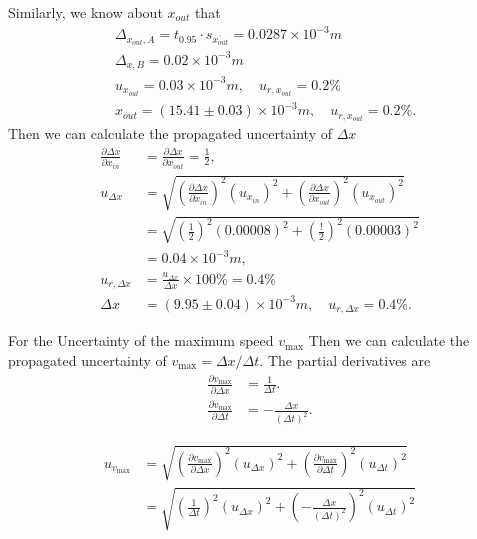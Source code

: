 Similarly, we know about $x_{out}$ that
\[
\begin{split}
    &\Delta_{x_{out},A}=t_{0.95}\cdot s_{\overline{x_{out}}}=0.0287\times10^{-3}m\\
    &\Delta_{x,B}=0.02\times10^{-3}m\\
    &u_{x_{out}}=0.03\times10^{-3}m,\quad
    u_{r,x_{out}}=0.2 \%    \\
    &x_{out}=(15.41\pm 0.03) \times10^{-3}m,\quad u_{r,x_{out}}=0.2\%.
\end{split}
\]
Then we can calculate the propagated uncertainty of $\Delta x$
\[
\begin{split}
    \frac{\partial\Delta x}{\partial x_{in}}&=\frac{\partial\Delta x}{\partial x_{out}}=\frac{1}{2},\\
    u_{\Delta x}&=\sqrt{(\frac{\partial\Delta x}{\partial x_{in}})^2(u_{x_{in}})^2+(\frac{\partial\Delta x}{\partial x_{out}})^2(u_{x_{out}})^2}\\ 
    &=\sqrt{(\frac{1}{2})^2(0.00008)^2+(\frac{!}{2})^2(0.00003)^2}\\
    &=0.04\times10^{-3}m,\\
    u_{r,\Delta x}&=\frac{u_{\Delta x}}{\Delta x}\times100\%=0.4\%\\[0.4cm]
    \Delta x&=(9.95\pm0.04)\times10^{-3}m,\quad u_{r,\Delta x}=0.4\%.
\end{split}
\]

For the Uncertainty of the maximum speed $v_{\max}$
Then we can calculate the propagated uncertainty of $v_{\max}=\Delta x/\Delta t$. The partial derivatives are
\[
\begin{split}
    \frac{\partial v_{\max}}{\partial \Delta x}&=\frac{1}{\Delta t}.\\[0.5cm]
    \frac{\partial v_{\max}}{\partial \Delta t}&=-\frac{\Delta x}{(\Delta t)^2}.    
\end{split}    
\]

\[
\begin{split}
    u_{v_{\max}}&=\sqrt{(\frac{\partial v_{\max}}{\partial \Delta x})^2(u_{\Delta x})^2+(\frac{\partial v_{\max}}{\partial \Delta t})^2(u_{\Delta t})^2}     \\
    &=\sqrt{(\frac{1}{\Delta t})^2(u_{\Delta x})^2+(-\frac{\Delta x}{(\Delta t)^2})^2(u_{\Delta t})^2}
\end{split}
\]
